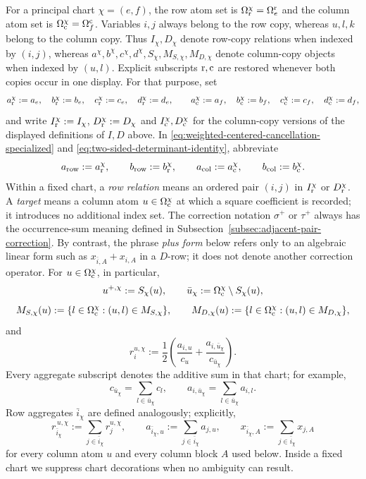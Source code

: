 \documentclass[11pt]{article}
\begin{document}
For a principal chart $\chi=(e,f)$, the row atom set is
$\Omega_{\rm r}^\chi=\Omega_e^{\rm r}$ and the column atom set is
$\Omega_{\rm c}^\chi=\Omega_f^{\rm c}$.  Variables $i,j$ always belong to
the row copy, whereas $u,l,k$ belong to the column copy.  Thus
$I_\chi,D_\chi$ denote row-copy relations when indexed by $(i,j)$, whereas
$a^\chi,b^\chi,c^\chi,d^\chi,S_\chi,M_{S,\chi},M_{D,\chi}$ denote
column-copy objects when indexed by $(u,l)$.  Explicit subscripts
${\rm r},{\rm c}$ are restored whenever both copies occur in one display.
For that purpose, set
\[
 a_{\rm r}^\chi:=a_e,\quad b_{\rm r}^\chi:=b_e,\quad
 c_{\rm r}^\chi:=c_e,\quad d_{\rm r}^\chi:=d_e,
 \qquad
 a_{\rm c}^\chi:=a_f,\quad b_{\rm c}^\chi:=b_f,\quad
 c_{\rm c}^\chi:=c_f,\quad d_{\rm c}^\chi:=d_f,
\]
and write $I_{\rm r}^\chi:=I_\chi$, $D_{\rm r}^\chi:=D_\chi$ and
$I_{\rm c}^\chi,D_{\rm c}^\chi$ for the column-copy versions of the displayed
definitions of $I,D$ above.  In
\eqref{eq:weighted-centered-cancellation-specialized} and
\eqref{eq:two-sided-determinant-identity}, abbreviate
\[
 a_{\rm row}:=a_{\rm r}^\chi,\qquad
 b_{\rm row}:=b_{\rm r}^\chi,\qquad
 a_{\rm col}:=a_{\rm c}^\chi,\qquad
 b_{\rm col}:=b_{\rm c}^\chi.
\]
Within a fixed chart, a \emph{row relation} means an ordered pair $(i,j)$ in
$I_{\rm r}^\chi$ or $D_{\rm r}^\chi$.  A \emph{target} means a column atom
$u\in\Omega_{\rm c}^\chi$ at which a square coefficient is recorded; it
introduces no additional index set.  The correction
notation $\sigma^+$ or $\tau^+$ always has the occurrence-sum meaning defined
in Subsection~\ref{subsec:adjacent-pair-correction}.  By contrast, the phrase
\emph{plus form} below refers only to an algebraic linear form such as
$x_{\bar i,A}+x_{i,A}$ in a $D$-row; it does not denote another correction
operator.
For $u\in\Omega_{\rm c}^\chi$, in particular,
\[
 u^{+,\chi}:=S_\chi(u),\qquad
 \bar u_\chi:=\Omega_{\rm c}^\chi\setminus S_\chi(u),
\]
\[
 M_{S,\chi}(u):=\{l\in\Omega_{\rm c}^\chi:(u,l)\in M_{S,\chi}\},
 \qquad
 M_{D,\chi}(u):=\{l\in\Omega_{\rm c}^\chi:(u,l)\in M_{D,\chi}\},
\]
and
\[
 r_i^{u,\chi}:=\frac12\left(
 \frac{a_{i,u}}{c_u}+\frac{a_{i,\bar u_\chi}}{c_{\bar u_\chi}}
 \right).
\]
Every aggregate subscript denotes the additive sum in that chart; for
example,
\[
 c_{\bar u_\chi}=\sum_{l\in\bar u_\chi}c_l,
 \qquad
 a_{i,\bar u_\chi}=\sum_{l\in\bar u_\chi}a_{i,l}.
\]
Row aggregates $\bar i_\chi$ are defined analogously; explicitly,
\[
 r_{\bar i_\chi}^{\,u,\chi}
 :=\sum_{j\in\bar i_\chi}r_j^{u,\chi},
 \qquad
 a_{\bar i_\chi,u}:=\sum_{j\in\bar i_\chi}a_{j,u},
 \qquad
 x_{\bar i_\chi,A}:=\sum_{j\in\bar i_\chi}x_{j,A}
\]
for every column atom $u$ and every column block $A$ used below.  Inside a
fixed chart we suppress chart decorations when no ambiguity can result.
\end{document}
